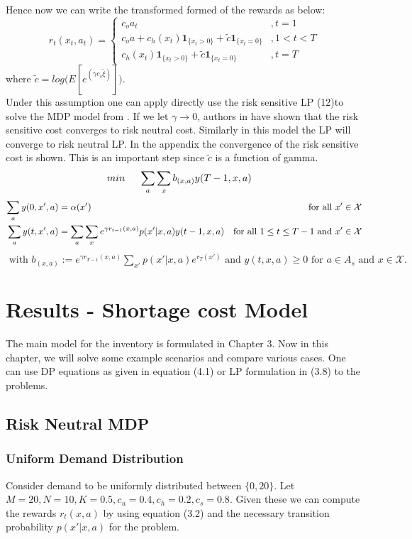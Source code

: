 \documentclass[11pt,a4paper,oneside]{report}
\begin{document}
Hence now we can write the transformed formed of the rewards as below:
\begin{equation}
r_t(x_t,a_t)=
\begin{cases}
c_{o}a_t&,t=1\\
c_{o}a + c_h(x_t)\mathbf{1}_{\lbrace x_t>0\rbrace} + \tilde{c}\mathbf{1}_{\lbrace x_t=0\rbrace}&,1<t< T\\
c_h(x_t)\mathbf{1}_{\lbrace x_t>0\rbrace} +\tilde{c}\mathbf{1}_{\lbrace x_t=0\rbrace}&,t=T
\end{cases}
\end{equation}
where $\tilde{c} = log\big(E[e^{(\gamma c_s \tilde{\xi})}]\big). $\\
Under this assumption one can apply directly use the risk sensitive LP (12)to solve the MDP model from \citep{kumar2015finite}. If we let $\gamma\rightarrow0$, authors in \citep{kumar2015finite} have shown that the risk sensitive cost converges to risk neutral cost. Similarly in this model the LP will converge to risk neutral LP. In the appendix the convergence of the risk sensitive cost is shown. This is an important step since $\tilde c$ is a function of gamma.
\pagebreak
\begin{align}
min\hspace{0.5cm} \sum_a &\sum_{x} b_{(x,a)}y(T-1,x,a)
\end{align}
\begin{align*}
\sum_a y(0,x',a)&=\alpha(x')     &\text{ for all } x'\in \cal{X} \\
\sum_a y(t,x',a)&= \sum_a \sum_x e^{\gamma r_{t-1}(x,a)}p(x'|x,a)y(t-1,x,a) &\text{for all } 1\leq t\leq T-1 \text{ and } x'\in \mathcal{X}
\end{align*}
$
\text{ with } b_{(x,a)}:= e^{\gamma r_{T-1}(x,a)}\sum_{x'} p(x'|x,a)e^{r_T(x')} \text{ and } y(t,x,a)\geq 0 \text{ for } a\in A_s \text{ and } x\in \mathcal{X}.$


\chapter{Results - Shortage cost Model}
The main model for the inventory is  formulated in Chapter 3. Now in this chapter, we will solve some example scenarios and compare various cases. One can use DP equations as given in equation (4.1) or LP formulation in (3.8) to the problems.
\section{Risk Neutral MDP}
\subsection{Uniform Demand Distribution}
Consider demand to be uniformly distributed between ${\lbrace0,20\rbrace}$. Let $M = 20, N = 10, K = 0.5, c_u = 0.4, c_h=0.2, c_s=0.8$. Given these we can compute the rewards $r_t(x,a)$ by using equation (3.2) and the necessary transition probability $p(x'|x,a)$ for the problem.
\end{document}
